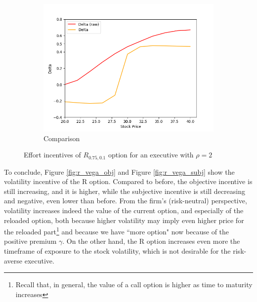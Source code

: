 \begin{figure}[H]
\begin{subfigure}{0.32\textwidth}
        \centering
        \includegraphics[width=\textwidth]{fig/4/r_delta_comp.png}
        \caption{Comparison}
        \label{fig:r_delta_comp}
    \end{subfigure}
    \caption{Effort incentives of $R_{0.75, 0.1}$ option for an executive with $\rho = 2$}
    \label{fig:r_delta_both}
\end{figure}
\vspace*{15pt}

To conclude, Figure \ref*{fig:r_vega_obj} and Figure \ref*{fig:r_vega_subj} show the volatility incentive of the R option. Compared to before, the objective incentive is still increasing, and it is higher, while the subjective incentive is still decreasing and negative, even lower than before. From the firm's (risk-neutral) perspective, volatility increases indeed the value of the current option, and especially of the reloaded option, both because higher volatility may imply even higher price for the reloaded part\footnote{Recall that, in general, the value of a call option is higher as time to maturity increases} and because we have ``more option" now because of the positive premium $\gamma$. On the other hand, the R option increases even more the timeframe of exposure to the stock volatility, which is not desirable for the risk-averse executive.

